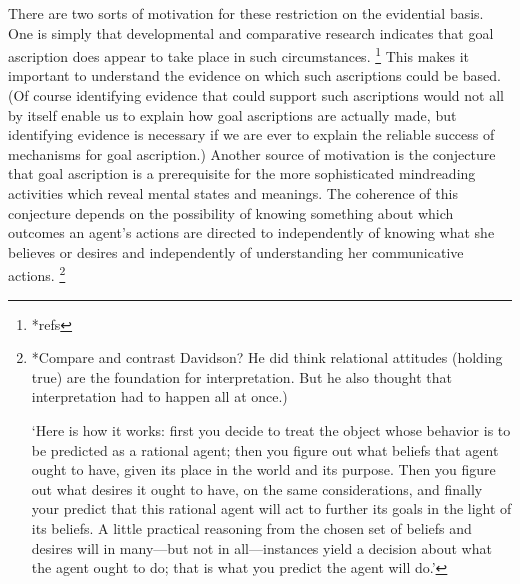 \documentclass[14pt,a4paper]{extarticle}
\begin{document}
There are two sorts of motivation for these restriction on the evidential basis.
One is simply that developmental and comparative research indicates that goal ascription does appear to take place  in such circumstances.%
\footnote{
*refs
}
This makes it important to understand the evidence on which such ascriptions could be based.
(Of course 
identifying evidence that could support such ascriptions 
would not all by itself enable us to explain how goal ascriptions are actually made, 
but identifying evidence is necessary if we are ever to explain the reliable success of mechanisms for goal ascription.)
Another source of motivation is the conjecture that goal ascription is a prerequisite for the more sophisticated mindreading activities which reveal mental states and meanings.
The coherence of this conjecture depends on the possibility of knowing something about which outcomes an agent's actions are directed to independently of knowing what she believes or desires and independently of understanding her communicative actions.%
\footnote{
*Compare and contrast Davidson?
He did think relational attitudes (holding true) are the foundation for interpretation.
But he also thought that interpretation had to happen all at once.)

\citet[p.\ 17]{Dennett:1987sf} `Here is how it works: first you decide to treat the object whose behavior is to be predicted as a rational agent; then you figure out what beliefs that agent ought to have, given its place in the world and its purpose.   Then you figure out what desires it ought to have, on the same considerations, and finally your predict that this rational agent will act to further its goals in the light of its beliefs.  A little practical reasoning from the chosen set of beliefs and desires will in many—but not in all—instances yield a decision about what the agent ought to do; that is what you predict the agent will do.'
}
\end{document}
